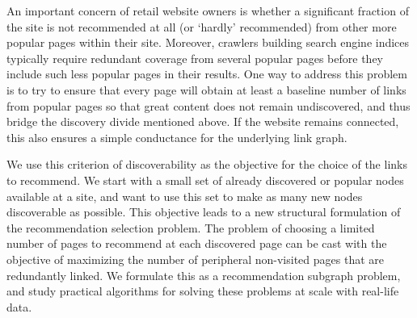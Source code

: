 An important concern of retail website owners is whether a significant fraction of the site is not recommended at all (or `hardly' recommended) from other more popular pages within their site. Moreover, crawlers building search engine indices typically require redundant coverage from several popular pages before they include such less popular pages in their results.
One way to address this
problem is to try to ensure that every page will obtain at least a baseline number of links from popular pages so that great content does not remain undiscovered, and thus bridge the discovery divide mentioned above. If the website
remains connected, this also ensures a simple conductance for the underlying link graph.  


We use this criterion of discoverability as the objective for the choice of the links to recommend. 
We start with a small set of already discovered or popular nodes available at a site, and want to use this set to make as many new nodes discoverable as possible. This objective leads to a new structural formulation of the recommendation selection problem. The problem of choosing a limited number of pages to recommend at each discovered page can be cast with the objective of maximizing the number of peripheral non-visited pages that are redundantly linked. We formulate this as a recommendation subgraph problem, and study practical algorithms for solving these problems at scale with real-life data. 

